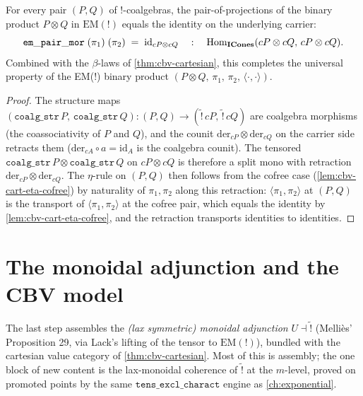 \begin{theorem}[The cartesian $\eta$-rule
$\langle \pi_1, \pi_2 \rangle = \mathrm{id}$]\label{thm:cbv-cart-eta}
\rocqok
{}
For every pair $(P, Q)$ of $\mathord{!}$-coalgebras, the
pair-of-projections of the binary product $P \otimes Q$ in
$\mathrm{EM}(\mathord{!})$ equals the identity on the underlying carrier:
\[
  \mathtt{em\_pair\_mor}\;(\pi_1)\;(\pi_2)
  \;=\;
  \mathrm{id}_{cP \otimes cQ}
  \quad : \quad
  \mathrm{Hom}_{\mathbf{ICones}}(cP \otimes cQ,\, cP \otimes cQ).
\]
Combined with the $\beta$-laws of \autoref{thm:cbv-cartesian}, this
completes the universal property of the EM(!) binary product
$(P \otimes Q,\, \pi_1,\, \pi_2,\, \langle \cdot, \cdot \rangle)$.
\end{theorem}

\begin{proof}
The structure maps
$(\mathtt{coalg\_str}\,P,\,\mathtt{coalg\_str}\,Q) : (P, Q) \to
(\widetilde{\mathord{!}}\,cP,\,\widetilde{\mathord{!}}\,cQ)$
are coalgebra morphisms (the coassociativity of $P$ and $Q$), and the
counit $\mathrm{der}_{cP} \otimes \mathrm{der}_{cQ}$ on the carrier
side retracts them ($\mathrm{der}_{cA} \circ a = \mathrm{id}_{A}$ is
the coalgebra counit). The tensored
$\mathtt{coalg\_str}\,P \otimes \mathtt{coalg\_str}\,Q$ on
$cP \otimes cQ$ is therefore a split mono with retraction
$\mathrm{der}_{cP} \otimes \mathrm{der}_{cQ}$. The $\eta$-rule on
$(P, Q)$ then follows from the cofree case
(\autoref{lem:cbv-cart-eta-cofree}) by naturality of $\pi_1, \pi_2$
along this retraction: $\langle \pi_1, \pi_2 \rangle$ at $(P, Q)$ is
the transport of $\langle \pi_1, \pi_2 \rangle$ at the cofree pair,
which equals the identity by \autoref{lem:cbv-cart-eta-cofree}, and the
retraction transports identities to identities.
\end{proof}

\section{The monoidal adjunction and the CBV model}\label{sec:cbv-model}

The last step assembles the \emph{(lax symmetric) monoidal adjunction}
$U \dashv \widetilde{\mathord{!}}$ (Melli\`es' Proposition 29, via
Lack's lifting of the tensor to $\mathrm{EM}(\mathord{!})$), bundled with
the cartesian value category of \autoref{thm:cbv-cartesian}. Most of this
is assembly; the one block of new content is the lax-monoidal coherence
of $\widetilde{\mathord{!}}$ at the $m$-level, proved on promoted
points by the same $\texttt{tens\_excl\_charact}$ engine as
\autoref{ch:exponential}.

